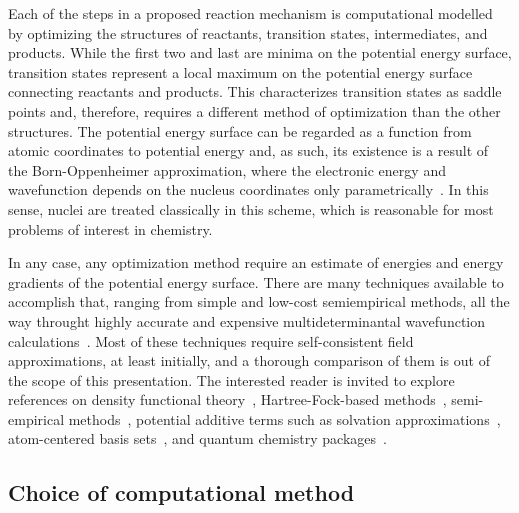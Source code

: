 Each of the steps in a proposed reaction mechanism is computational modelled
by optimizing the structures of reactants,
transition states,
intermediates,
and products.
While the first two and last are minima on the potential energy surface,
transition
states represent a local maximum on the potential energy surface connecting
reactants and products.
This characterizes transition states as saddle points and,
therefore,
requires
a different method of optimization than the other structures.
The potential energy surface can be regarded as a function from atomic coordinates to potential energy and,
as such,
its existence is a result of the Born-Oppenheimer approximation,
where the electronic energy and wavefunction depends on the nucleus coordinates
only parametrically~\cite{Born_1927}.
In this sense,
nuclei are treated classically in this scheme,
which is reasonable for most problems of interest in chemistry.

In any case,
any optimization method require an estimate of energies and energy gradients
of the potential energy surface.
There are many techniques available to accomplish that,
ranging from simple and low-cost semiempirical methods,
all the way throught highly accurate and expensive multideterminantal wavefunction calculations~\cite{Perdew_2001}.
Most of these techniques require self-consistent field approximations,
at least initially,
and a thorough comparison of them is out of the scope of this presentation.
The interested reader is invited to explore
references on density functional theory~\cite{Hohenberg_1964,Kohn_1965,Perdew_1996,Perdew_1997,Ernzerhof_1999,Adamo_1999,Chai_2008a,Chai_2008b,Goerigk_2011,Arago_2011,Salzner_2011,Burns_2011,Minenkov_2012,Perdew_2014,Kryachko_2014,Yu_2016,DFT2016_poll},
Hartree-Fock-based methods~\cite{Szabo_1996},
semi-empirical methods~\cite{MOPAC},
potential additive terms such as solvation approximations~\cite{Marenich_2009,Marenich_2012},
atom-centered basis sets~\cite{Ditchfield_1971,Hehre_1972,Hariharan_1973,Hariharan_1974,Gordon_1980,Francl_1982,Clark_1983,Frisch_1984,Binning_1990,Szabo_1996,Helgaker_1997,Blaudeau_1997,Rassolov_1998,Rassolov_2001,Jensen_2012,Hill_2012},
and quantum chemistry packages~\cite{g09}.

\subsection{Choice of computational method}%
\label{sec:choice-of-method}

